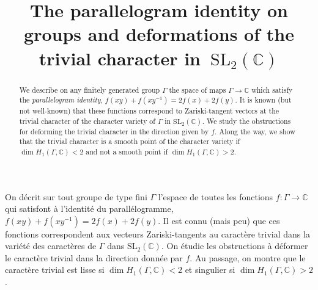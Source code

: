 \documentclass[JEP,XML,SOM,Unicode,NoEqCountersInSection]{cedram}
\theoremstyle{definition}
\begin{document}
\frontmatter
\title[Parallelograms on groups]{The parallelogram identity on groups and deformations of the trivial character
in~$\mathrm{SL}_2(\mathbb{C})$}

\author[\initial{J.} \lastname{Marché}]{ }
\address{Sorbonne Université, Université Paris Diderot, CNRS,
Institut de Mathématiques de Jussieu-Paris Rive Gauche, IMJ-PRG\\
F-75005, Paris, France}

\author[\initial{M.} \lastname{Wolff}]{ }\address{Sorbonne Université, Université Paris Diderot, CNRS,
Institut de Mathématiques de Jussieu-Paris Rive Gauche, IMJ-PRG\\
F-75005, Paris, France}

\begin{abstract}
We describe on any finitely generated group $\Gamma$ the space of maps $\Gamma\to\mathbb{C}$ which satisfy the {\em parallelogram identity}, $f(xy)+f(xy^{-1})=2f(x)+2f(y)$. It is known (but not well-known) that these functions correspond to Zariski-tangent vectors at the trivial character of the character variety of $\Gamma$ in $\mathrm{SL}_2(\mathbb{C})$. We study the obstructions for deforming the trivial character in the direction given by $f$. Along the way, we show that the trivial character is a smooth point of the character variety if $\dim H_1(\Gamma,\mathbb{C})<2$ and not a smooth point if $\dim H_1(\Gamma,\mathbb{C})>2$.
\end{abstract}





\begin{altabstract}
On décrit sur tout groupe de type fini $\Gamma$ l'espace de toutes les fonctions $f:\Gamma\to\mathbb{C}$ qui satisfont à
l'identité du parallélogramme, $f(xy)+f(xy^{-1})=2f(x)+2f(y)$.
Il est connu (mais peu) que ces fonctions correspondent aux vecteurs Zariski-tangents au caractère trivial dans la variété des
caractères de $\Gamma$ dans $\mathrm{SL}_2(\mathbb{C})$. On étudie les obstructions à déformer le caractère trivial dans la direction
donnée par $f$. Au passage, on montre que le caractère trivial est lisse si $\dim H_1(\Gamma,\mathbb{C})<2$ et singulier si
$\dim H_1(\Gamma,\mathbb{C})>2$.
\end{altabstract}
\end{document}
